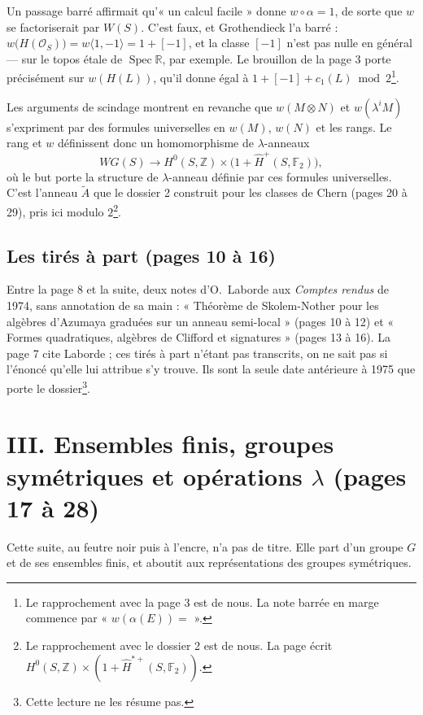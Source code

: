 \documentclass[11pt,a4paper]{article}
\begin{document}
Un passage barré affirmait qu'« un calcul facile » donne $w \circ \alpha = 1$,
de sorte que $w$ se factoriserait par $W(S)$. C'est faux, et Grothendieck
l'a barré : $w\bigl(H(\mathcal{O}_S)\bigr) = w\langle 1, -1 \rangle = 1 +
[-1]$, et la classe $[-1]$ n'est pas nulle en général — sur le topos étale de
$\operatorname{Spec} \mathbb{R}$, par exemple. Le brouillon de la page 3
porte précisément sur $w(H(L))$, qu'il donne égal à
$1 + [-1] + c_1(L) \bmod 2$\footnote{Le
rapprochement avec la page 3 est de nous. La note barrée en marge commence
par « $w(\alpha(E)) = $ ».}.

Les arguments de scindage montrent en revanche que $w(M \otimes N)$ et
$w(\lambda^{i} M)$ s'expriment par des formules universelles en $w(M)$,
$w(N)$ et les rangs. Le rang et $w$ définissent donc un homomorphisme de
$\lambda$-anneaux
\[
WG(S) \longrightarrow H^{0}(S, \mathbb{Z}) \times \bigl(1 +
\widehat{H}^{+}(S, \mathbb{F}_2)\bigr),
\]
où le but porte la structure de $\lambda$-anneau définie par ces formules
universelles. C'est l'anneau $\widetilde{A}$ que le dossier 2 construit pour
les classes de Chern (pages 20 à 29), pris ici modulo $2$\footnote{Le
rapprochement avec le dossier 2 est de nous. La page écrit
$H^{0}(S, \mathbb{Z}) \times (1 + \hat{H}^{*+}(S, \mathbb{F}_2))$.}.

\subsection*{Les tirés à part (pages 10 à 16)}

Entre la page 8 et la suite, deux notes d'O.~Laborde aux \emph{Comptes rendus}
de 1974, sans annotation de sa main : « Théorème de Skolem-Nother pour les
algèbres d'Azumaya graduées sur un anneau semi-local » (pages 10 à 12) et
« Formes quadratiques, algèbres de Clifford et signatures » (pages 13 à 16).
La page 7 cite Laborde ; ces tirés à part n'étant pas transcrits, on ne
sait pas si l'énoncé qu'elle lui attribue s'y trouve. Ils sont la seule
date antérieure à 1975 que porte le dossier\footnote{Cette lecture ne les
résume pas.}.

\section*{III. Ensembles finis, groupes symétriques et opérations $\lambda$ (pages 17 à 28)}

Cette suite, au feutre noir puis à l'encre, n'a pas de titre. Elle part d'un
groupe $G$ et de ses ensembles finis, et aboutit aux représentations des
groupes symétriques.
\end{document}
